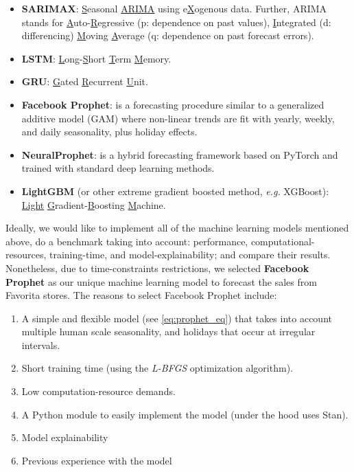 \begin{itemize}
\item \textbf{SARIMAX}: \underline{S}easonal \underline{ARIMA} using e\underline{X}ogenous data. Further, ARIMA stands for \underline{A}uto-\underline{R}egressive (p: dependence on past values), \underline{I}ntegrated (d: differencing) \underline{M}oving \underline{A}verage (q: dependence on past forecast errors). 
\item \textbf{LSTM}\autocite{hochreiter1997long}: \underline{L}ong-\underline{S}hort \underline{T}erm \underline{M}emory.
\item \textbf{GRU}\autocite{cho2014learning}: \underline{G}ated \underline{R}ecurrent \underline{U}nit.
\item \textbf{Facebook Prophet}\autocite{taylor2018forecasting}: is a forecasting procedure similar to a generalized additive model\autocite{hastie1987generalized} (GAM) where non-linear trends are fit with yearly, weekly, and daily seasonality, plus holiday effects.
\item \textbf{NeuralProphet}\autocite{triebe2021neuralprophet}: is a hybrid forecasting framework based on PyTorch and trained with standard deep learning methods.
\item \textbf{LightGBM}\autocite{ke2017lightgbm} (or other extreme gradient boosted method, \textit{e.g.} XGBoost): \underline{Light} \underline{G}radient-\underline{B}oosting \underline{M}achine.
\end{itemize}


Ideally, we would like to implement all of the  machine learning models mentioned above, do a benchmark taking into account: performance, computational-resources, training-time, and model-explainability; and compare their results. Nonetheless, due to time-constraints restrictions, we selected \textbf{Facebook Prophet} as our unique machine learning model to forecast the sales from Favorita stores. The reasons to select Facebook Prophet include:

\begin{enumerate}
\item A simple and flexible model (see \autoref{eq:prophet_eq}) that takes into account multiple human scale seasonality, and holidays that occur at irregular intervals.
\item Short training time (using the \textit{L-BFGS}  optimization algorithm\autocite{byrd1995limited}).
\item Low computation-resource demands.
\item A Python module to easily implement the model (under the hood uses Stan\autocite{carpenter2017stan}).
\item Model explainability
\item Previous experience with the model
\end{enumerate} 

